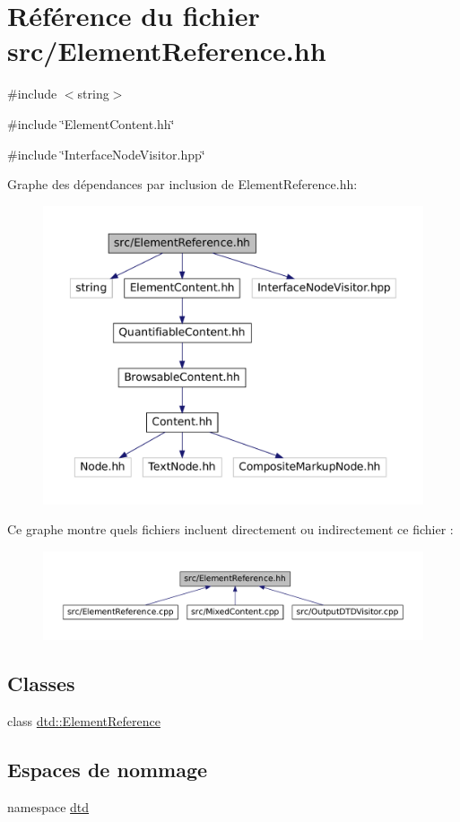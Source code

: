 \hypertarget{_element_reference_8hh}{
\section{Référence du fichier src/ElementReference.hh}
\label{_element_reference_8hh}
}
{\ttfamily \#include $<$string$>$}\par
{\ttfamily \#include \char`\"{}ElementContent.hh\char`\"{}}\par
{\ttfamily \#include \char`\"{}InterfaceNodeVisitor.hpp\char`\"{}}\par
Graphe des dépendances par inclusion de ElementReference.hh:\nopagebreak
\begin{figure}[H]
\begin{center}
\leavevmode
\includegraphics[width=400pt]{_element_reference_8hh__incl}
\end{center}
\end{figure}
Ce graphe montre quels fichiers incluent directement ou indirectement ce fichier :\nopagebreak
\begin{figure}[H]
\begin{center}
\leavevmode
\includegraphics[width=400pt]{_element_reference_8hh__dep__incl}
\end{center}
\end{figure}
\subsection*{Classes}
\begin{DoxyCompactItemize}
\item 
class \hyperlink{classdtd_1_1_element_reference}{dtd::ElementReference}
\end{DoxyCompactItemize}
\subsection*{Espaces de nommage}
\begin{DoxyCompactItemize}
\item 
namespace \hyperlink{namespacedtd}{dtd}
\end{DoxyCompactItemize}
